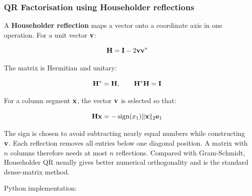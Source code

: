 \subsubsection{QR Factorisation using Householder reflections}

A \textbf{Householder reflection} maps a vector onto a coordinate axis in one
operation. For a unit vector $ \mathbf{v} $:

\begin{equation}
    \mathbf{H}=\mathbf{I}-2\mathbf{v}\mathbf{v}^{*}
\end{equation}

The matrix is Hermitian and unitary:

\begin{equation}
    \mathbf{H}^{*}=\mathbf{H},\qquad \mathbf{H}^{*}\mathbf{H}=\mathbf{I}
\end{equation}

For a column segment $ \mathbf{x} $, the vector $ \mathbf{v} $ is selected so that:

\begin{equation}
    \mathbf{H}\mathbf{x}=-\operatorname{sign}(x_1)\| {\mathbf{x}} \|_2\mathbf{e}_1
\end{equation}

The sign is chosen to avoid subtracting nearly equal numbers while constructing
$ \mathbf{v} $. Each reflection removes all entries below one diagonal position. A
matrix with $ n $ columns therefore needs at most $ n $ reflections. Compared
with Gram-Schmidt, Householder QR usually gives better numerical orthogonality
and is the standard dense-matrix method.

Python implementation:

